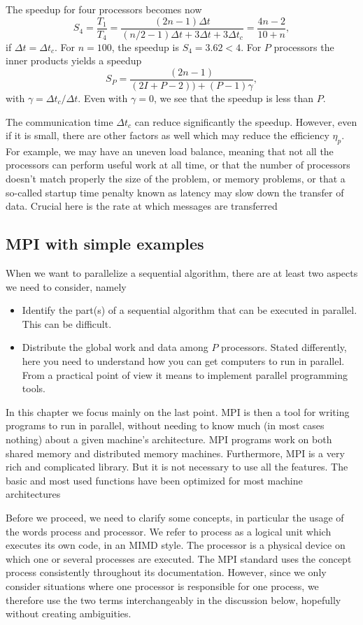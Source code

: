 The speedup for four processors becomes now
\[ S_4=\frac{T_1}{T_4} = \frac{(2n-1)\Delta t}{(n/2-1)\Delta t+3\Delta t +3\Delta t_c}=\frac{4n-2}{10+n},\] 
if $\Delta t = \Delta t_c$. 
For $n=100$, the speedup is $S_4=  3.62 < 4$. 
For $P$ processors the inner products yields a speedup 
\[
S_P = \frac{(2n-1)}{(2I+P-2))+(P-1)\gamma},
\]
with $\gamma = \Delta t_c/\Delta t$.
Even with $\gamma = 0$, we see that the speedup is less than $P$.

The communication time $\Delta t_c$ can reduce significantly the speedup. However, even if it is small, there are other
factors as well which may reduce the efficiency $\eta_p$. For example, 
we may have an uneven load balance, meaning that not all the processors can perform useful
work at all time, or that the number of processors doesn't match properly the size of the problem, or memory problems, 
or that a so-called startup time penalty known as latency may slow down the transfer of data.  Crucial here is the rate 
at which messages are transferred



\subsection{MPI with simple examples}

When we want to parallelize a sequential algorithm, there are at least two aspects we need to consider, namely
\begin{itemize}
\item Identify the part(s) of a sequential algorithm that can be 
executed in parallel.  This can be difficult.
\item Distribute the global work and data among $P$ processors.  Stated differently, here you need to understand how you can
get computers to run in parallel. From a practical point of view it means to implement parallel programming tools.
\end{itemize}
In this chapter we focus mainly on the last point. MPI is then a tool for writing programs to run in parallel, without needing
to know much (in most cases nothing) about a given machine's architecture.
MPI programs work on both shared memory and distributed memory machines. Furthermore, 
MPI is a very rich and complicated library. But it is not necessary to use all the features.
The basic and most used functions  have been optimized for most machine architectures 

Before we proceed, we need to clarify some concepts, in particular the usage of the words process and processor.
We refer to process as a logical unit which executes its own code,
in an MIMD style. The processor is a physical device on which one or several processes
are executed. The MPI standard uses the concept process consistently throughout
its documentation. However, since we only consider situations where one processor is
responsible for one process, we therefore use the
two terms interchangeably in the discussion below, hopefully without creating ambiguities.


